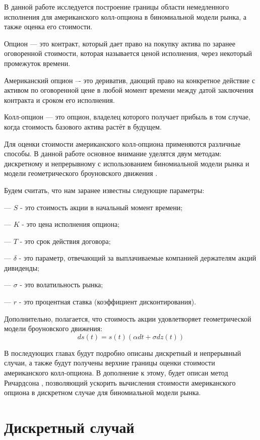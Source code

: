 \documentclass[oneside,final,12pt]{article}
\begin{document}
    В данной работе исследуется построение границы области немедленного исполнения для американского колл-опциона в биномиальной модели рынка, а также оценка его стоимости.
    
    Опцион --- это контракт, который дает право на покупку актива по заранее оговоренной стоимости, которая называется ценой исполнения, через некоторый промежуток времени.
    
    Американский опцион –- это дериватив, дающий право на конкретное действие с активом по оговоренной цене в любой момент времени между датой заключения контракта и сроком его исполнения.
    
    Колл-опцион — это опцион, владелец которого получает прибыль в том
    случае, когда стоимость базового актива растёт в будущем.
    
    Для оценки стоимости американского колл-опциона применяются различные способы. В данной работе основное внимание уделятся двум методам: дискретному и непрерывному с использованием биномиальной модели рынка и модели геометрического броуновского движения \cite{cox}.
    
    Будем считать, что нам заранее известны следующие параметры:
    
    --- $S$ - это стоимость акции в начальный момент времени;
    
    --- $K$ - это цена исполнения опциона;
    
    --- $T$ - это срок действия договора;
    
    --- $\delta$ - это параметр, отвечающий за выплачиваемые компанией держателям акций дивиденды;
    
    --- $\sigma$ - это волатильность рынка;
    
    --- $r$ - это процентная ставка (коэффициент дисконтирования).
    
    Дополнительно, полагается, что стоимость акции удовлетворяет геометрической модели броуновского движения:
    $$ ds(t) = s(t)(\alpha dt+\sigma dz(t)) $$
    
    В последующих главах будут подробно описаны дискретный и непрерывный случаи, а также будут получены верхние границы оценки стоимости американского колл-опциона. В дополнение к этому, будет описан метод Ричардсона \cite{geske}, позволяющий ускорить вычисления стоимости американского опциона в дискретном случае для биномиальной модели рынка.
    
\newpage
\section{Дискретный случай}
    
\end{document}
